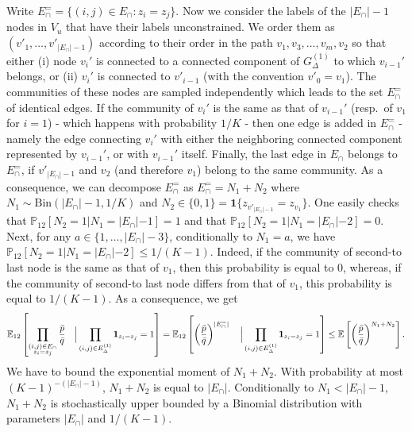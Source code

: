 \documentclass[final]{colt2026}
\newcommand{\1}{\mathbf{1}}
\newcommand{\bbE}{\mathbb{E}}
\newcommand{\cro}[1]{\left[#1\right]}
\begin{document}
Write $E_\cap^{=} = \{(i,j)\in E_{\cap}: z_{i}=z_{j}\}$. Now we consider the labels of the $|E_{\cap}|-1$ nodes in $V_u$ that have their labels unconstrained. We order them as $(v'_1,\ldots, v'_{|E_{\cap}|-1})$ according to their order in the path $v_1,v_3, \ldots, v_m, v_2$ so that either (i) node $v_i'$ is connected to a connected component of $G_\Delta^{(1)}$ to which $v_{i-1}'$ belongs, or (ii) $v_i'$ is connected to $v'_{i-1}$ (with the convention $v'_0=v_1$). The communities of these nodes are sampled independently which leads to the set $E_\cap^{=}$ of identical edges. If the community of $v_i'$ is the same as that of $v_{i-1}'$ (resp.~of $v_1$ for $i=1$) - which happens with probability $1/K$ - then one edge is added in $E_\cap^{=}$ - namely the edge connecting $v_i'$ with either the neighboring  connected component represented by $v_{i-1}'$, or with $v_{i-1}'$ itself. Finally, the last edge in $E_{\cap}$ belongs to  $E_{\cap}^{=}$, if $v'_{|E_{\cap}|-1}$ and $v_2$ (and therefore $v_1$) belong to the same community. As a consequence, we can decompose $E_{\cap}^{=}$ as $E_{\cap}^{=}=N_1+N_2$ where $N_1\sim \mathrm{Bin}(|E_{\cap}|-1,1/K)$ and $N_2\in \{0,1\}= \mathbf{1}\{z_{v'_{|E_{\cap}|-1}}=z_{v_1}\}$. One easily checks that $\mathbb{P}_{12}[N_2=1|N_1=|E_{\cap}|-1]=1$ and that  $\mathbb{P}_{12}[N_2=1|N_1=|E_{\cap}|-2]=0$. Next, for any $a\in \{1,\ldots,|E_{\cap}|-3\}$, conditionally to $N_1=a$, we have $\mathbb{P}_{12}[N_2=1|N_1=|E_{\cap}|-2]\leq 1/(K-1)$. Indeed, if the community of second-to last node is the same as that of $v_1$, then this probability is equal to $0$, whereas, if the community of second-to last node differs from that of $v_1$, this probability is equal to $1/(K-1)$.  As a consequence, we get
\[\mathbb{E}_{12}\left[\prod_{\substack{(i,j)\in E_{\cap}\\ z_{i}=z_{j}}}{\bar p\over \bar q}~~~\Big| \prod_{(i,j)\in E^{(1)}_{\Delta} }\mathbf 1_{z_{i}=z_{j}} = 1\right] = \mathbb{E}_{12}\left[\left({\bar p\over \bar q}\right)^{|E_\cap^{=}|}~~~\Big| \prod_{(i,j)\in E^{(1)}_{\Delta} }\mathbf 1_{z_{i}=z_{j}} = 1\right] \leq \mathbb{E}\left[ \left({\bar p\over \bar q}\right)^{N_1+N_2} \right] .\]
We have to bound the exponential moment of $N_1+ N_2$. With probability at most $(K-1)^{-(|E_\cap|-1)}$, $N_1+N_2$ is equal to $|E_{\cap}|$. Conditionally to $N_1 < |E_{\cap}|-1$, $N_1+N_2$ is stochastically upper bounded by a Binomial distribution with parameters $|E_{\cap}|$ and $1/(K-1)$. 
\end{document}
